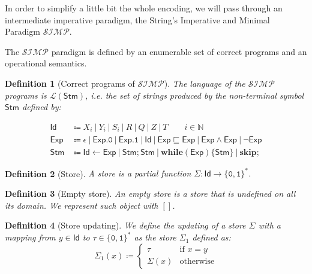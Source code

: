 \documentclass[10pt]{amsart}
\newcommand{\SIMP}{\mathcal{SIMP}}
\newcommand{\zero}{\mathtt{0}}
\newcommand{\one}{\mathtt{1}}
\newcommand{\NN}{\mathbb{N}}
\newcommand{\lang}[1]{\mathcal L(#1)}
\newcommand{\id}{\mathsf{Id}}
\newcommand{\stm}{\mathsf{Stm}}
\newcommand{\xp}{\mathsf{Exp}}
\newcommand{\while}[2]{\mathbf{while}(#1)\{#2\}}
\newcommand{\sk}{\mathbf{skip};}
\newcommand{\takes}{\leftarrow}
\newcommand{\store}{\Sigma}
\newtheorem{defn}{Definition}
\begin{document}
In order to simplify a little bit the whole encoding, we will pass through an intermediate imperative paradigm, the String's Imperative and Minimal Paradigm $\SIMP$.

The $\SIMP$ paradigm is defined by an enumerable set of correct programs and an operational semantics.


\begin{defn}[Correct programs of $\SIMP$]
The language of the $\SIMP$ programs is $\lang{\stm}$, i.e. the set of strings produced by the non-terminal symbol $\stm$ defined by:

\begin{align*}
\id &\Coloneqq X_i\ |\ Y_i\ |\ S_i\ |\ R\ |\ Q\ |\ Z\ |\ T\qquad i \in \NN\\
\xp &\Coloneqq \epsilon\ |\ \xp.\zero\ |\ \xp.\one\ |\ \id\ |\ \xp \sqsubseteq \xp\ |\ \xp \land \xp\ |\ \lnot \xp\\
\stm & \Coloneqq \id \takes \xp\ |\ \stm;\stm\ |\ \while \xp \stm\ |\ \sk
\end{align*}
\end{defn}

\begin{defn}[Store]
A store is a partial function $\store: \id \longrightarrow \{\zero, \one\}^*$.
\end{defn}

\begin{defn}[Empty store]
An \emph{empty} store is a store that is undefined on all its domain. We represent such object with $[]$.
\end{defn}

\begin{defn}[Store updating]
We define the updating of a store $\store$ with a mapping from $y \in \id$ to $\tau \in \{\zero, \one\}^*$ as the store $\store_1$ defined as:
\[
\store_1(x) \coloneqq \begin{cases} \tau & \text{if } x = y\\ \store(x) & \text{otherwise}\end{cases}
\]
\end{defn}
\end{document}
